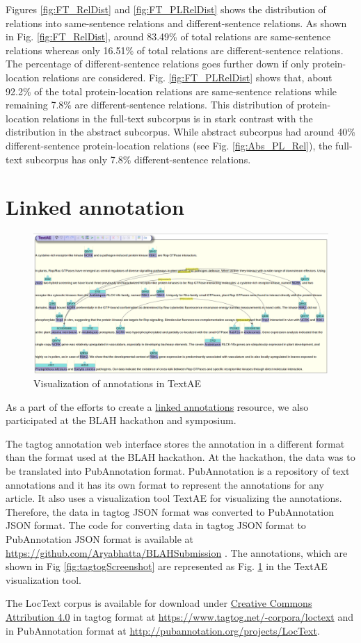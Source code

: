 Figures \ref{fig:FT_RelDist} and \ref{fig:FT_PLRelDist} shows the distribution of relations into same-sentence relations and different-sentence relations. As shown in Fig. \ref{fig:FT_RelDist}, around 83.49\% of total relations are same-sentence relations whereas only 16.51\% of total relations are different-sentence relations. The percentage of different-sentence relations goes further down if only protein-location relations are considered. Fig. \ref{fig:FT_PLRelDist} shows that, about 92.2\% of the total protein-location relations are same-sentence relations while remaining 7.8\% are different-sentence relations. This distribution of protein-location relations in the full-text subcorpus is in stark contrast with the distribution in the abstract subcorpus. While abstract subcorpus had around 40\% different-sentence protein-location relations (see Fig. \ref{fig:Abs_PL_Rel}), the full-text subcorpus has only 7.8\% different-sentence relations.

\section{Linked annotation}


\begin{figure}
\centering
\includegraphics[scale=0.25]{figures/TextAE_Vis.png}
\caption{Visualization of annotations in TextAE}\label{fig:TextAEVis}
\end{figure}

As a part of the efforts to create a \hyperref[http://2015.linkedannotation.org/background]{linked annotations} resource, we also participated at the BLAH \cite{blah} hackathon and symposium.

The tagtog annotation web interface stores the annotation in a different format than the format used at the BLAH hackathon. At the hackathon, the data was to be translated into PubAnnotation format. PubAnnotation \cite{kim2012pubannotation} is a repository of text annotations and it has its own format to represent the annotations for any article. It also uses a visualization tool TextAE \cite{textae} for visualizing the annotations. Therefore, the data in tagtog JSON format was converted to PubAnnotation JSON format. The code for converting data in tagtog JSON format to PubAnnotation JSON format is available at \url{https://github.com/Aryabhatta/BLAHSubmission} \cite{blahsubmission}. The annotations, which are shown in Fig \ref{fig:tagtogScreenshot} are represented as Fig. \ref{fig:TextAEVis} in the TextAE visualization tool. 

The LocText corpus is available for download under \hyperref[https://creativecommons.org/licenses/by/4.0/]{Creative Commons Attribution 4.0} in tagtog format at \url{https://www.tagtog.net/-corpora/loctext} and in PubAnnotation format at \url{http://pubannotation.org/projects/LocText}.